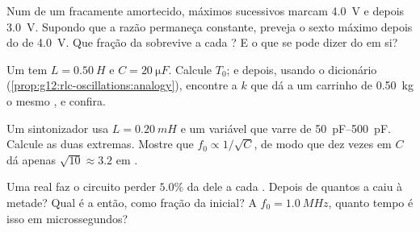 \begin{exercise}[$\star\star$]\label{exo:g12:rlc-oscillations:10}
Num  de um  fracamente amortecido, máximos sucessivos marcam
\qty{4.0}{V} e depois \qty{3.0}{V}. Supondo que a razão permaneça constante, preveja o
sexto máximo depois do de \qty{4.0}{V}. Que fração da \emph{} sobrevive a cada
? E o que se pode dizer do  em si?
\end{exercise}

\begin{exercise}[$\star\star$]\label{exo:g12:rlc-oscillations:11}
Um  tem $L = \qty{0.50}{H}$ e $C = \qty{20}{\micro F}$. Calcule $T_0$; e
depois, usando o dicionário (\cref{prop:g12:rlc-oscillations:analogy}), encontre a
 $k$ que dá a um carrinho de \qty{0.50}{kg} o mesmo , e
confira.
\end{exercise}

\begin{exercise}[$\star\star\star$]\label{exo:g12:rlc-oscillations:12}
Um sintonizador usa $L = \qty{0.20}{mH}$ e um  variável que varre de
\qtyrange{50}{500}{pF}. Calcule as duas  extremas. Mostre que
$f_0 \propto 1/\sqrt{C}$, de modo que dez vezes em $C$ dá apenas
$\sqrt{10} \approx 3.2$ em .
\end{exercise}

\begin{exercise}[$\star\star\star$]\label{exo:g12:rlc-oscillations:13}
Uma  real faz o circuito perder $5.0\%$ da  dele a cada .
Depois de quantos  a  caiu à metade? Qual é a  então, como
fração da inicial? A $f_0 = \qty{1.0}{MHz}$, quanto tempo é isso em microssegundos?
\end{exercise}


